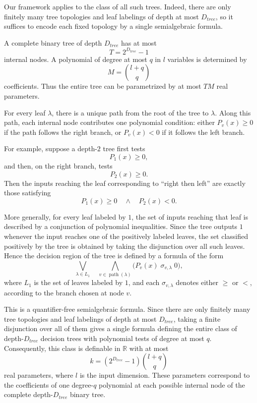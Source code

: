 \documentclass[11pt]{article}
\theoremstyle{plain}
\theoremstyle{definition}
\theoremstyle{remark}
\newcommand{\R}{\mathbb{R}}
\begin{document}
Our framework applies to the class of all such trees. Indeed, there are only
finitely many tree topologies and leaf labelings of depth at most
\(D_{tree}\), so it suffices to encode each fixed topology by a single
semialgebraic formula.

A complete binary tree of depth \(D_{tree}\) has at most
\[
T=2^{D_{tree}}-1
\]
internal nodes. A polynomial of degree at most \(q\) in \(l\) variables is
determined by
\[
M=\binom{l+q}{q}
\]
coefficients. Thus the entire tree can be parametrized by at most \(TM\) real
parameters.

For every leaf \(\lambda\), there is a unique path from the root of the tree to
\(\lambda\). Along this path, each internal node contributes one polynomial
condition: either \(P_v(x)\ge 0\) if the path follows the right branch, or
\(P_v(x)<0\) if it follows the left branch.

For example, suppose a depth-\(2\) tree first tests
\[
P_1(x)\ge 0,
\]
and then, on the right branch, tests
\[
P_2(x)\ge 0.
\]
Then the inputs reaching the leaf corresponding to “right then left” are exactly
those satisfying
\[
P_1(x)\ge 0
\quad\wedge\quad
P_2(x)<0.
\]

More generally, for every leaf labeled by \(1\), the set of inputs reaching
that leaf is described by a conjunction of polynomial inequalities. Since the
tree outputs \(1\) whenever the input reaches one of the positively labeled
leaves, the set classified positively by the tree is obtained by taking the
disjunction over all such leaves. Hence the decision region of the tree is
defined by a formula of the form
\[
\bigvee_{\lambda\in L_1}
\quad
\bigwedge_{v\in \operatorname{path}(\lambda)}
\bigl(P_v(x)\;\sigma_{v,\lambda}\;0\bigr),
\]
where \(L_1\) is the set of leaves labeled by \(1\), and each
\(\sigma_{v,\lambda}\) denotes either \(\ge \) or \(<\), according to the
branch chosen at node \(v\).

This is a quantifier-free semialgebraic formula. Since there are only finitely
many tree topologies and leaf labelings of depth at most \(D_{tree}\), taking
a finite disjunction over all of them gives a single formula defining the entire
class of depth-\(D_{tree}\) decision trees with polynomial tests of degree at
most \(q\). Consequently, this class is definable in \(\R\) with at most
\[
k
=
(2^{D_{tree}}-1)\binom{l+q}{q}
\]
real parameters, where \(l\) is the input dimension. These parameters
correspond to the coefficients of one degree-\(q\) polynomial at each possible
internal node of the complete depth-\(D_{tree}\) binary tree.
\end{document}
